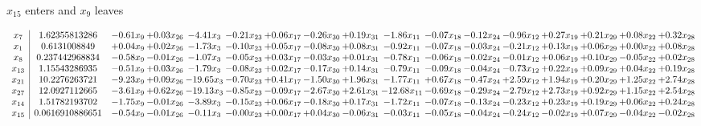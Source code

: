 \documentclass[9pt]{article}
\begin{document}
 $ x_{15} $ enters and $ x_{9} $ leaves 

 \[\begin{array}{c| c c@{\hskip 2pt} c@{\hskip 2pt} c@{\hskip 2pt} c@{\hskip 2pt} c@{\hskip 2pt} c@{\hskip 2pt} c@{\hskip 2pt} c@{\hskip 2pt} c@{\hskip 2pt} c@{\hskip 2pt} c@{\hskip 2pt} c@{\hskip 2pt} c@{\hskip 2pt} c@{\hskip 2pt} c@{\hskip 2pt} }
 x_{7}   &  1.62355813286 & -0.61 x_{9} & +  0.03 x_{26} & -4.41 x_{3} & -0.21 x_{23} & +  0.06 x_{17} & -0.26 x_{30} & +  0.19 x_{31} & -1.86 x_{11} & -0.07 x_{18} & -0.12 x_{24} & -0.96 x_{12} & +  0.27 x_{19} & +  0.21 x_{29} & +  0.08 x_{22} & +  0.32 x_{28}\\
 x_{1}   &  0.6131008849 & +  0.04 x_{9} & +  0.02 x_{26} & -1.73 x_{3} & -0.10 x_{23} & +  0.05 x_{17} & -0.08 x_{30} & +  0.08 x_{31} & -0.92 x_{11} & -0.07 x_{18} & -0.03 x_{24} & -0.21 x_{12} & +  0.13 x_{19} & +  0.06 x_{29} & +  0.00 x_{22} & +  0.08 x_{28}\\
 x_{8}   &  0.237442968834 & -0.58 x_{9} & -0.01 x_{26} & -1.07 x_{3} & -0.05 x_{23} & +  0.03 x_{17} & -0.03 x_{30} & +  0.01 x_{31} & -0.78 x_{11} & -0.06 x_{18} & -0.02 x_{24} & -0.01 x_{12} & +  0.06 x_{19} & +  0.10 x_{29} & -0.05 x_{22} & +  0.02 x_{28}\\
 x_{13}   &  1.15543286935 & -0.51 x_{9} & +  0.03 x_{26} & -1.79 x_{3} & -0.08 x_{23} & +  0.02 x_{17} & -0.17 x_{30} & +  0.14 x_{31} & -0.79 x_{11} & -0.09 x_{18} & -0.04 x_{24} & -0.73 x_{12} & +  0.22 x_{19} & +  0.09 x_{29} & +  0.04 x_{22} & +  0.19 x_{28}\\
 x_{21}   &  10.2276263721 & -9.23 x_{9} & +  0.09 x_{26} & -19.65 x_{3} & -0.70 x_{23} & +  0.41 x_{17} & -1.50 x_{30} & +  1.96 x_{31} & -1.77 x_{11} & +  0.67 x_{18} & -0.47 x_{24} & +  2.59 x_{12} & +  1.94 x_{19} & +  0.20 x_{29} & +  1.25 x_{22} & +  2.74 x_{28}\\
 x_{27}   &  12.0927112665 & -3.61 x_{9} & +  0.62 x_{26} & -19.13 x_{3} & -0.85 x_{23} & -0.09 x_{17} & -2.67 x_{30} & +  2.61 x_{31} & -12.68 x_{11} & -0.69 x_{18} & -0.29 x_{24} & -2.79 x_{12} & +  2.73 x_{19} & +  0.92 x_{29} & +  1.15 x_{22} & +  2.54 x_{28}\\
 x_{14}   &  1.51782193702 & -1.75 x_{9} & -0.01 x_{26} & -3.89 x_{3} & -0.15 x_{23} & +  0.06 x_{17} & -0.18 x_{30} & +  0.17 x_{31} & -1.72 x_{11} & -0.07 x_{18} & -0.13 x_{24} & -0.23 x_{12} & +  0.23 x_{19} & +  0.19 x_{29} & +  0.06 x_{22} & +  0.24 x_{28}\\
 x_{15}   &  0.0616910886651 & -0.54 x_{9} & -0.01 x_{26} & -0.11 x_{3} & -0.00 x_{23} & +  0.00 x_{17} & +  0.04 x_{30} & -0.06 x_{31} & -0.03 x_{11} & -0.05 x_{18} & -0.04 x_{24} & -0.24 x_{12} & -0.02 x_{19} & +  0.07 x_{29} & -0.04 x_{22} & -0.02 x_{28}\\

\end{array}\]
\end{document}
